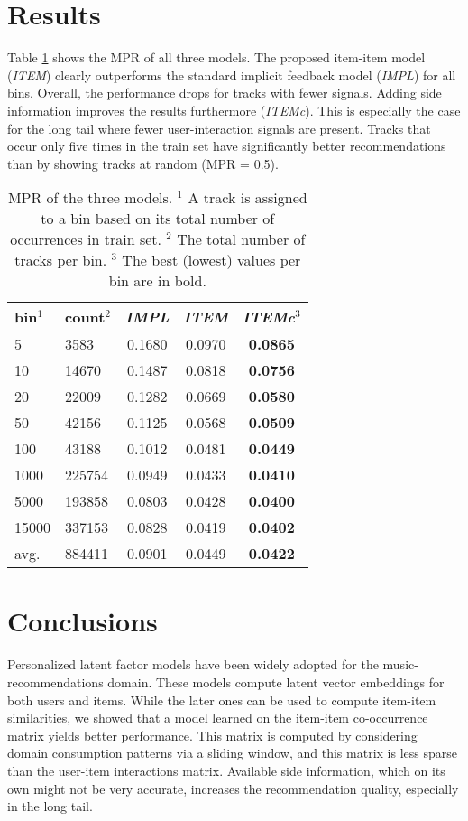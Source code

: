 \documentclass[twocolumn]{article}
\begin{document}
\section{Results}

Table \ref{table:mpr} shows the MPR of all three models. The proposed item-item model (\textit{ITEM}) clearly outperforms the standard implicit feedback model (\textit{IMPL}) for all bins. Overall, the performance drops for tracks with fewer signals. Adding side information improves the results furthermore (\textit{ITEMc}). This is especially the case for the long tail where fewer user-interaction signals are present. Tracks that occur only five times in the train set have significantly better recommendations than by showing tracks at random (MPR = 0.5).

\begin{table}[t]
  \begin{tabular}{ll|ccc}
    bin$^1$ & count$^2$ & \textit{IMPL} & \textit{ITEM} & \textit{ITEMc}$^3$ \\
    \hline
5     & 3583   & 0.1680 & 0.0970 & \textbf{0.0865} \\
10    & 14670  & 0.1487 & 0.0818 & \textbf{0.0756} \\
20    & 22009  & 0.1282 & 0.0669 & \textbf{0.0580} \\
50    & 42156  & 0.1125 & 0.0568 & \textbf{0.0509} \\
100   & 43188  & 0.1012 & 0.0481 & \textbf{0.0449} \\
1000  & 225754 & 0.0949 & 0.0433 & \textbf{0.0410} \\
5000  & 193858 & 0.0803 & 0.0428 & \textbf{0.0400} \\
15000 & 337153 & 0.0828 & 0.0419 & \textbf{0.0402} \\
\hline
avg. & 884411 & 0.0901 & 0.0449 & \textbf{0.0422} \\
  \end{tabular}
  \caption{MPR of the three models. $^1$ A track is assigned to a bin based on its total number of occurrences in train set. $^2$ The total number of tracks per bin. $^3$ The best (lowest) values per bin are in bold.}
  \label{table:mpr}
\end{table}

\section{Conclusions}
Personalized latent factor models have been widely adopted for the music-recommendations domain. These models compute latent vector embeddings for  both users and items. While the later ones can be used to compute item-item similarities, we showed that a model learned on the item-item co-occurrence matrix yields better performance. This matrix is computed by considering domain consumption patterns via a sliding window, and this matrix is less sparse than the user-item interactions matrix. Available side information, which on its own might not be very accurate, increases the recommendation quality, especially in the long tail.
\end{document}
